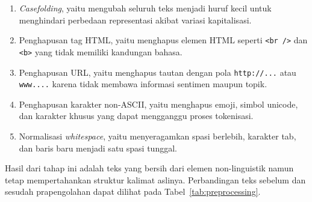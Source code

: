 \begin{enumerate}
    \item \textit{Casefolding}, yaitu mengubah seluruh teks menjadi
    huruf kecil untuk menghindari perbedaan representasi akibat variasi
    kapitalisasi.

    \item Penghapusan tag HTML, yaitu menghapus elemen HTML seperti
    \texttt{<br />} dan \texttt{<b>} yang tidak memiliki kandungan bahasa.

    \item Penghapusan URL, yaitu menghapus tautan dengan pola
    \texttt{http://...} atau \texttt{www....} karena tidak membawa informasi
    sentimen maupun topik.

    \item Penghapusan karakter non-ASCII, yaitu menghapus emoji,
    simbol unicode, dan karakter khusus yang dapat mengganggu proses
    tokenisasi.

    \item Normalisasi \textit{whitespace}, yaitu menyeragamkan
    spasi berlebih, karakter tab, dan baris baru menjadi satu spasi tunggal.
\end{enumerate}

Hasil dari tahap ini adalah teks yang bersih dari elemen non-linguistik
namun tetap mempertahankan struktur kalimat aslinya. Perbandingan teks
sebelum dan sesudah prapengolahan dapat dilihat pada
Tabel~\ref{tab:preprocessing}.

